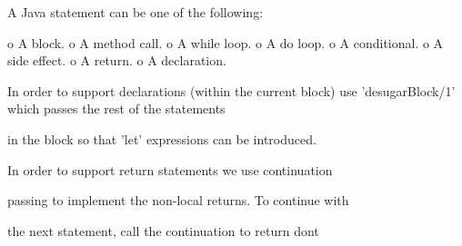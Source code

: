       A Java statement can be one of the following:

      
        o A block.
        o A method call.
        o A while loop.
        o A do loop.
        o A conditional.
        o A side effect.
        o A return.
        o A declaration.
        
      In order to support declarations (within the current block)
      use 'desugarBlock/1' which passes the rest of the statements

      in the block so that 'let' expressions can be introduced.
      
      In order to support return statements we use continuation

      passing to implement the non-local returns. To continue with

      the next statement, call the continuation to return dont

